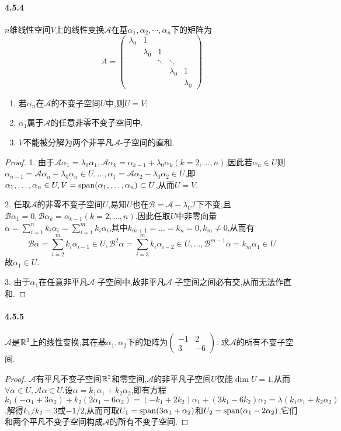 \documentclass[11pt]{article}
\begin{document}
\paragraph{4.5.4}$n$维线性空间$V$上的线性变换$\mathscr{A}$在基$\alpha_1,\alpha_2,\cdots,\alpha_n$下的矩阵为
$$A=\begin{pmatrix}
    \lambda_0  & 1 &  &  &  \\
     & \lambda_0 & 1 &  &  \\
     &  & \ddots & \ddots &  \\
     &  &  & \lambda_0 & 1 \\
     &  &  &  & \lambda_0
\end{pmatrix}$$
\begin{enumerate}
    \item 若$\alpha_n$在$\mathscr{A}$的不变子空间$U$中,则$U=V$;
    \item $\alpha_1$属于$\mathscr{A}$的任意非零不变子空间中.
    \item $V$不能被分解为两个非平凡$\mathscr{A}$-子空间的直和.
\end{enumerate}
\begin{proof}
    1. 由于$\mathscr{A}\alpha_1=\lambda_0\alpha_1, \mathscr{A}\alpha_{k}=\alpha_{k-1}+\lambda_0\alpha_k (k=2,\dots,n)$,因此若$\alpha_n\in U$则$\alpha_{n-1}=\mathscr{A}\alpha_n-\lambda_0 \alpha_n\in U, \dots, \alpha_1=\mathscr{A}\alpha_2-\lambda_0\alpha_2\in U$,即$\alpha_1,\dots,\alpha_n\in U, V=\mathrm{span}(\alpha_1,\dots,\alpha_n)\subset U$,从而$U=V$.

    2. 任取$\mathscr{A}$的非零不变子空间$U$,易知$U$也在$\mathscr{B}=\mathscr{A}-\lambda_0\mathscr{I}$下不变,且$\mathscr{B}\alpha_1=0, \mathscr{B}\alpha_k=\alpha_{k-1} (k=2,\dots,n)$.因此任取$U$中非零向量$\alpha=\sum_{i=1}^{n}k_i\alpha_i=\sum_{i=1}^{m}k_i\alpha_i$,其中$k_{m+1}=\dots=k_n=0, k_m\neq 0$,从而有
    $$\mathscr{B}\alpha=\sum_{i=2}^{m}k_i\alpha_{i-1}\in U, \mathscr{B}^2\alpha=\sum_{i=3}^{m}k_i\alpha_{i-2}\in U, \dots, \mathscr{B}^{m-1}\alpha=k_m\alpha_1\in U$$
    故$\alpha_1\in U$.

    3. 由于$\alpha_1$在任意非平凡$\mathscr{A}$-子空间中,故非平凡$\mathscr{A}$-子空间之间必有交,从而无法作直和.
\end{proof}
\paragraph{4.5.5}$\mathscr{A}$是$\mathbb{R}^2$上的线性变换,其在基$\alpha_1,\alpha_2$下的矩阵为$\begin{pmatrix}
    -1&2\\ 3&-6
\end{pmatrix}$.
求$\mathscr{A}$的所有不变子空间.
\begin{proof}
    $\mathscr{A}$有平凡不变子空间$\mathbb{R}^2$和零空间,$\mathscr{A}$的非平凡子空间$U$仅能$\dim U=1$,从而$\forall \alpha\in U, \mathscr{A}\alpha\in U$.设$\alpha=k_1\alpha_1+k_2\alpha_2$,即有方程$k_1(-\alpha_1+3\alpha_2)+k_2(2\alpha_1-6\alpha_2)=(-k_1+2k_2)\alpha_1+(3k_1-6k_2)\alpha_2=\lambda(k_1\alpha_1+k_2\alpha_2)$.解得$k_1/k_2=3$或$-1/2$,从而可取$U_1=\mathrm{span}(3\alpha_1+\alpha_2)$和$U_2=\mathrm{span}(\alpha_1-2\alpha_2)$,它们和两个平凡不变子空间构成$\mathscr{A}$的所有不变子空间.
\end{proof}
\end{document}
